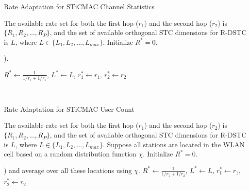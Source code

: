 \documentclass[peerreview,draftcls,onecolumn,12pt,a4paper]{IEEEtran}
\begin{document}
\newpage
\begin{algorithm}
\begin{minipage}{1\linewidth}
\caption{Rate Adaptation for STiCMAC Channel Statistics}          \begin{algorithmic}[1]
 \label{channelstatisticssearch}
\small \STATE The available rate set for both the
first hop ($r_1$) and the second hop ($r_2$) is $\{R_1,R_2,...,R_P\}$, and the set of available orthogonal STC
dimensions for R-DSTC is $L$, where $L  \in
\{L_1,L_2,...,L_{max}\}$. {Initialize $R^* = 0$}.

 ).

 \STATE $R^* \leftarrow \frac {1} {1/r_1 + 1/r_2}$,
$L^* \leftarrow L$, $r_1^* \leftarrow r_1$, $r_2^* \leftarrow
r_2$\ \ENDIF

\ENDFOR
\end{algorithmic}
\end{minipage} \\
\end{algorithm}

\begin{algorithm}
\begin{minipage}{1\linewidth}
\caption{Rate Adaptation for STiCMAC User Count}
 \label{usercountsearch}
\begin{algorithmic}[1]
\small \STATE The available rate set for both the
first hop ($r_1$) and the second hop ($r_2$) is $\{R_1,R_2,...,R_P\}$, and the set of available orthogonal STC
dimensions for R-DSTC is $L$, where $L  \in
\{L_1,L_2,...,L_{max}\}$. Suppose all stations are located in the
WLAN cell based on a random distribution function $\chi$.
{Initialize $R^* = 0$}.

  ) and average over
all these locations using $\chi$. \ENDFOR {} \STATE $R^*
\leftarrow \frac {1} {1/r_1 + 1/r_2}$, $L^* \leftarrow L$, $r_1^*
\leftarrow r_1$, $r_2^* \leftarrow r_2$\ \ENDIF \ENDFOR

 \end{algorithmic}
\end{minipage}
\end{algorithm}
\end{document}
